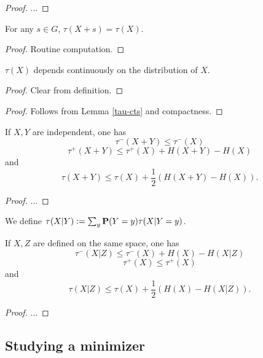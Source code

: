 \begin{proof} ...
\end{proof}

\begin{lemma}\label{tau-invariant}  For any $s \in G$, $\tau(X+s) = \tau(X)$.
\end{lemma}

\begin{proof} Routine computation.
\end{proof}

\begin{lemma}\label{tau-cts} $\tau(X)$ depends continuously on the distribution of $X$.
\end{lemma}

\begin{proof}  Clear from definition.
\end{proof}

\begin{proof} Follows from Lemma \ref{tau-cts} and compactness.
\end{proof}

\begin{lemma}\label{tau-sums}  If $X,Y$ are independent, one has
  $$ \tau^-(X+Y) \leq \tau^-(X)$$
  $$ \tau^+(X+Y) \leq \tau^+(X) + H(X+Y) - H(X)$$
and
  $$ \tau(X+Y) \leq \tau(X) + \frac{1}{2}( H(X+Y) - H(X) ).$$
\end{lemma}

\begin{proof}
  ...
\end{proof}


\begin{definition}  We define $\tau(X|Y) := \sum_y {\bf P}(Y=y) \tau(X|Y=y)$.
\end{definition}

\begin{lemma}  If $X,Z$ are defined on the same space, one has
  $$ \tau^-(X|Z) \leq \tau^-(X) + H(X) - H(X|Z)$$
  $$ \tau^+(X) \leq \tau^+(X)$$
and
  $$ \tau(X|Z) \leq \tau(X) + \frac{1}{2}( H(X) - H(X|Z) ).$$
\end{lemma}

\begin{proof}
  ...
\end{proof}


\subsection{Studying a minimizer}


